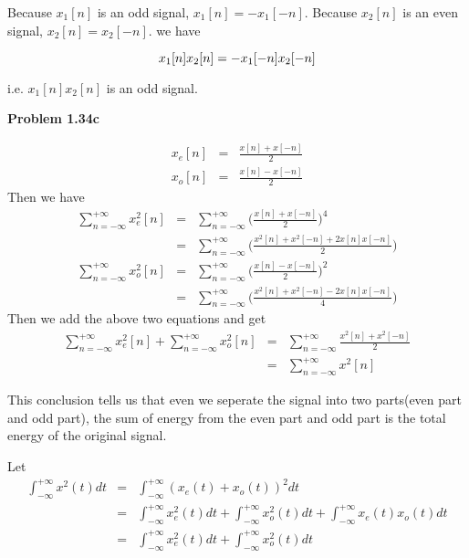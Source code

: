 \documentclass[koma,a4paper,utopia,12pt,listings-color,microtype,paralist,colorlinks,urlcolor=red]{org-article}
\begin{document}
Because \(x_{1}[n]\) is an odd signal, \(x_{1}[n] = -x_{1}[-n]\). Because
\(x_{2}[n]\) is an even signal, \(x_{2}[n] = x_{2}[-n]\). we have

\begin{equation*}
x_{1}[n]x_{2}[n] = -x_{1}[-n]x_{2}[-n] \\
\end{equation*}

i.e. \(x_{1}[n]x_{2}[n]\) is an odd signal.

\textbf{Problem 1.34c}

\begin{eqnarray*}
x_{e}[n] &=& \frac{x[n] + x[-n]}{2} \\
x_{o}[n] &=& \frac{x[n] - x[-n]}{2}
\end{eqnarray*}
Then we have
\begin{eqnarray*}
\sum_{n=-\infty}^{+\infty} x_{e}^{2}[n]  &=& \sum_{n=-\infty}^{+\infty} \bigg(  \frac{ x[n] + x[-n] }{2} \bigg)^{4}   \\
&=& \sum_{n=-\infty}^{+\infty} \bigg(  \frac{ x^{2}[n]  + x^{2}[-n] + 2x[n]x[-n]}{2} \bigg)
\end{eqnarray*}
\begin{eqnarray*}
\sum_{n=-\infty}^{+\infty} x_{o}^{2}[n]  &=& \sum_{n=-\infty}^{+\infty} \bigg(  \frac{ x[n] - x[-n] }{2} \bigg)^{2}   \\
&=& \sum_{n=-\infty}^{+\infty} \bigg(  \frac{ x^{2}[n]  + x^{2}[-n] - 2x[n]x[-n]}{4} \bigg)
\end{eqnarray*}
Then we add the above two equations and get
\begin{eqnarray*}
\sum_{n=-\infty}^{+\infty} x_{e}^{2}[n] +  \sum_{n=-\infty}^{+\infty} x_{o}^{2}[n]  &=& \sum_{n=-\infty}^{+\infty} \frac{x^{2}[n] + x^{2}[-n]}{2} \\
&=& \sum_{n=-\infty}^{+\infty} x^{2}[n]
\end{eqnarray*}

This conclusion tells us that even we seperate the signal into two parts(even
part and odd part), the sum of energy from the even part and odd part is the
total energy of the original signal.

Let
\begin{eqnarray*}
\int_{-\infty}^{+\infty} x^{2}(t) dt &=& \int_{-\infty}^{+\infty} ( x_{e}(t) + x_{o}(t) )^{2}dt  \\
&=& \int_{-\infty}^{+\infty} x_{e}^{2}(t)dt + \int_{-\infty}^{+\infty} x_{o}^{2}(t) dt + \int_{-\infty}^{+\infty} x_{e}(t)x_{o}(t) dt \\
&=& \int_{-\infty}^{+\infty} x_{e}^{2}(t)dt + \int_{-\infty}^{+\infty} x_{o}^{2}(t) dt
\end{eqnarray*}
\end{document}

